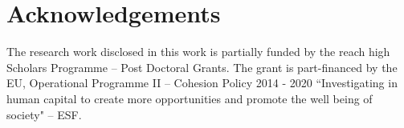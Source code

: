 \documentclass[output=paper]{LSP/langsci}
\begin{document}






\section*{Acknowledgements}

The research work disclosed in this work is partially funded by the {\sc reach high} Scholars Programme -- Post Doctoral Grants. The grant is part-financed by the EU, Operational Programme II -- Cohesion Policy 2014 - 2020 ``Investigating in human capital to create more opportunities and promote the well being of society" -- ESF.

\sloppy
\printbibliography[heading=subbibliography,notkeyword=this]
\end{document}
